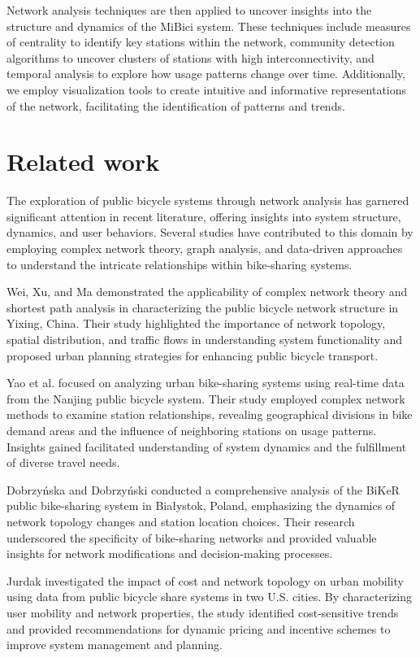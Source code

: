 \documentclass[conference]{IEEEtran}
\begin{document}
Network analysis techniques are then applied to uncover insights into the structure and dynamics of the MiBici system. These techniques include measures of centrality to identify key stations within the network, community detection algorithms to uncover clusters of stations with high interconnectivity, and temporal analysis to explore how usage patterns change over time. Additionally, we employ visualization tools to create intuitive and informative representations of the network, facilitating the identification of patterns and trends.

\section{Related work}
The exploration of public bicycle systems through network analysis has garnered significant attention in recent literature, offering insights into system structure, dynamics, and user behaviors. Several studies have contributed to this domain by employing complex network theory, graph analysis, and data-driven approaches to understand the intricate relationships within bike-sharing systems.

Wei, Xu, and Ma \cite{wei2019exploring} demonstrated the applicability of complex network theory and shortest path analysis in characterizing the public bicycle network structure in Yixing, China. Their study highlighted the importance of network topology, spatial distribution, and traffic flows in understanding system functionality and proposed urban planning strategies for enhancing public bicycle transport.

Yao et al. \cite{yao2019analysis} focused on analyzing urban bike-sharing systems using real-time data from the Nanjing public bicycle system. Their study employed complex network methods to examine station relationships, revealing geographical divisions in bike demand areas and the influence of neighboring stations on usage patterns. Insights gained facilitated understanding of system dynamics and the fulfillment of diverse travel needs.

Dobrzyńska and Dobrzyński \cite{dobrzynska2017structure} conducted a comprehensive analysis of the BiKeR public bike-sharing system in Białystok, Poland, emphasizing the dynamics of network topology changes and station location choices. Their research underscored the specificity of bike-sharing networks and provided valuable insights for network modifications and decision-making processes.

Jurdak \cite{jurdak2013impact} investigated the impact of cost and network topology on urban mobility using data from public bicycle share systems in two U.S. cities. By characterizing user mobility and network properties, the study identified cost-sensitive trends and provided recommendations for dynamic pricing and incentive schemes to improve system management and planning.
\end{document}
